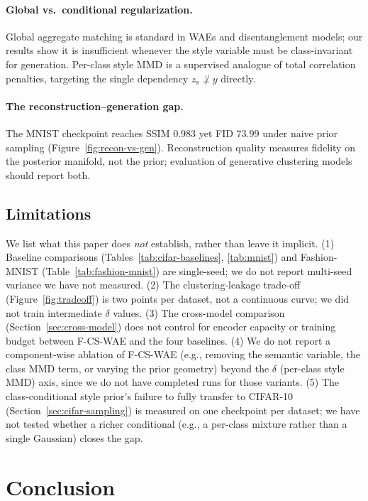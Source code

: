 \documentclass[10pt,letterpaper]{article}
\newcommand{\ours}{F-CS-WAE}
\newcommand{\zs}{z_{\mathrm{s}}}
\begin{document}
\paragraph{Global vs.\ conditional regularization.}
Global aggregate matching is standard in WAEs and disentanglement models;
our results show it is insufficient whenever the style variable must be
class-invariant for generation. Per-class style MMD is a supervised analogue
of total correlation penalties, targeting the single dependency
$\zs\not\perp y$ directly.

\paragraph{The reconstruction--generation gap.}
The MNIST checkpoint reaches SSIM $0.983$ yet FID $73.99$ under naive prior
sampling (Figure~\ref{fig:recon-vs-gen}). Reconstruction quality measures
fidelity on the posterior manifold, not the prior; evaluation of generative
clustering models should report both.

\subsection{Limitations}
\label{sec:limitations}

We list what this paper does \emph{not} establish, rather than leave it
implicit. (1) Baseline comparisons (Tables~\ref{tab:cifar-baselines},
\ref{tab:mnist}) and Fashion-MNIST (Table~\ref{tab:fashion-mnist}) are
single-seed; we do not report multi-seed variance we have not measured.
(2) The clustering-leakage trade-off (Figure~\ref{fig:tradeoff}) is two
points per dataset, not a continuous curve; we did not train intermediate
$\delta$ values. (3) The cross-model comparison
(Section~\ref{sec:cross-model}) does not control for encoder capacity or
training budget between \ours{} and the four baselines. (4) We do not
report a component-wise ablation of \ours{} (e.g., removing the semantic
variable, the class MMD term, or varying the prior geometry) beyond the
$\delta$ (per-class style MMD) axis, since we do not have completed runs for
those variants. (5) The class-conditional style prior's failure to fully
transfer to CIFAR-10 (Section~\ref{sec:cifar-sampling}) is measured on one
checkpoint per dataset; we have not tested whether a richer conditional
(e.g., a per-class mixture rather than a single Gaussian) closes the gap.

\section{Conclusion}
\end{document}

